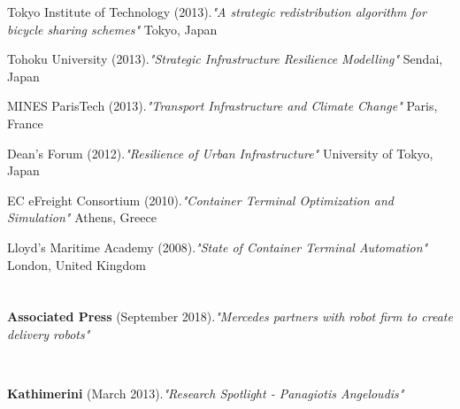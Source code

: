 \documentclass[margin]{res}
\begin{document}
\begin{resume}
\begin{etaremune}
	Tokyo Institute of Technology (2013).\textit{"{A strategic redistribution algorithm for bicycle sharing schemes}"} Tokyo, Japan
	\item
	Tohoku University (2013).\textit{"{Strategic Infrastructure Resilience Modelling}"} Sendai, Japan
	\item
	MINES ParisTech (2013).\textit{"{Transport Infrastructure and Climate Change}"} Paris, France
	\item
	Dean's Forum (2012).\textit{"{Resilience of Urban Infrastructure}"} University of Tokyo, Japan
	\item
	EC eFreight Consortium (2010).\textit{"{Container Terminal Optimization and Simulation}"} Athens, Greece
	\item
	Lloyd's Maritime Academy (2008).\textit{"{State of Container Terminal Automation}"} London, United Kingdom
\end{etaremune}

\section{}
	\begin{minipage}{\textwidth}
	{\bf Associated Press} (September 2018).\textit{"{Mercedes partners with robot firm to create delivery robots}"}	\end{minipage}
	\\
	\begin{minipage}{\textwidth}
	{\bf Kathimerini} (March 2013).\textit{"{Research Spotlight - Panagiotis Angeloudis}"}	\end{minipage}
	\\

\end{resume}
\end{document}
